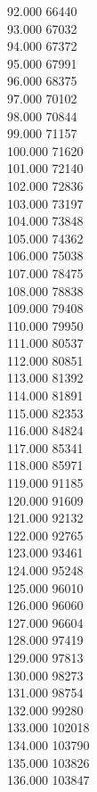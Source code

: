 { 92.000	66440 \\
 93.000	67032 \\
 94.000	67372 \\
 95.000	67991 \\
 96.000	68375 \\
 97.000	70102 \\
 98.000	70844 \\
 99.000	71157 \\
 100.000	71620 \\
 101.000	72140 \\
 102.000	72836 \\
 103.000	73197 \\
 104.000	73848 \\
 105.000	74362 \\
 106.000	75038 \\
 107.000	78475 \\
 108.000	78838 \\
 109.000	79408 \\
 110.000	79950 \\
 111.000	80537 \\
 112.000	80851 \\
 113.000	81392 \\
 114.000	81891 \\
 115.000	82353 \\
 116.000	84824 \\
 117.000	85341 \\
 118.000	85971 \\
 119.000	91185 \\
 120.000	91609 \\
 121.000	92132 \\
 122.000	92765 \\
 123.000	93461 \\
 124.000	95248 \\
 125.000	96010 \\
 126.000	96060 \\
 127.000	96604 \\
 128.000	97419 \\
 129.000	97813 \\
 130.000	98273 \\
 131.000	98754 \\
 132.000	99280 \\
 133.000	102018 \\
 134.000	103790 \\
 135.000	103826 \\
 136.000	103847 \\
}
